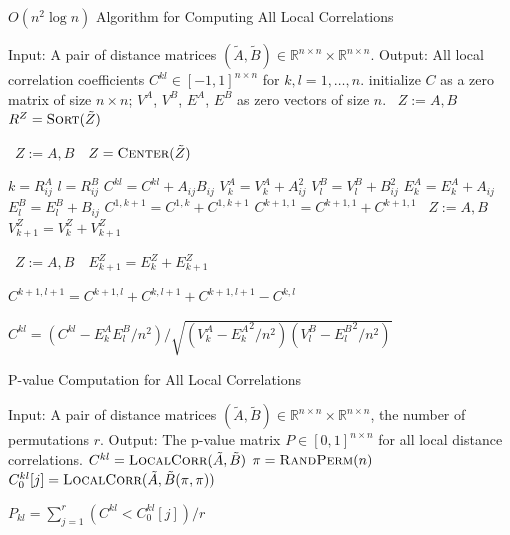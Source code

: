 \documentclass[11pt]{article}
\newcommand{\Real}{\mathbb{R}}
\newcommand{\G}{C}
\newcommand{\Linefor}[2]{%
    \State \algorithmicfor\ {#1}\ \algorithmicdo\ {#2} \algorithmicend\ \algorithmicfor%
}
\begin{document}
\begin{algorithm}
\caption{$O(n^2 \log n)$ Algorithm for Computing All Local Correlations}
\label{alg:all_scales}
\begin{algorithmic}[1]
\Statex Input: A pair of distance matrices $(\tilde{A},\tilde{B}) \in \Real^{n \times n} \times \Real^{n \times n}$.
\Statex Output: All local correlation coefficients $\G^{kl} \in [-1,1]^{n \times n}$ for $k,l=1,\ldots,n$.
\State initialize $\G$ as a zero matrix of size $n \times n$; $V^{A}$, $V^{B}$, $E^{A}$, $E^{B}$ as zero vectors of size $n$.
\Linefor{$Z:=A,B$}{$R^{Z}=\textsc{Sort}(\tilde{Z})$}
\Linefor{$Z:=A,B$}{$Z=\textsc{Center}(\tilde{Z})$}
\State $k=R^{A}_{ij}$
\State $l=R^{B}_{ij}$
\State $\G^{kl}=\G^{kl}+A_{ij}B_{ij}$
\State $V^{A}_{k}=V^{A}_{k}+A_{ij}^2$
\State $V^{B}_{l}=V^{B}_{l}+B_{ij}^2$
\State $E^{A}_{k}=E^{A}_{k}+A_{ij}$
\State $E^{B}_{l}=E^{B}_{l}+B_{ij}$
\EndFor
\Statex {}
\State $\G^{1, k+1}=\G^{1, k}+\G^{1, k+1}$
\State $\G^{k+1,1}=\G^{k+1,1}+\G^{k+1,1}$
\Linefor{$Z:=A,B$}{$V^{Z}_{k+1}=V^{Z}_{k}+V^{Z}_{k+1}$}
\Linefor{$Z:=A,B$}{$E^{Z}_{k+1}=E^{Z}_{k}+E^{Z}_{k+1}$}
\EndFor

\State $\G^{k+1,l+1}=\G^{k+1,l}+\G^{k,l+1}+\G^{k+1,l+1}-\G^{k,l}$
\EndFor

 
\State $\G^{kl}=\left(\G^{kl}-E^{A}_{k}E^{B}_{l}/n^2\right)/\sqrt{\left(V^{A}_{k}-{E^{A}_{k}}^2/n^2\right) \left(V^{B}_{l}-{E^{B}_{l}}^2/n^2\right)}$
\EndFor
\EndFunction
\end{algorithmic}
\end{algorithm}

\begin{algorithm}
\caption{P-value Computation for All Local Correlations}
\label{alg:pval}
\begin{algorithmic}[1]
\Statex Input: A pair of distance matrices $(\tilde{A},\tilde{B}) \in \Real^{n \times n} \times \Real^{n \times n}$, the number of permutations $r$.
\Statex Output: The p-value matrix $P \in [0,1]^{n \times n}$ for all local distance correlations.
\State $\G^{kl}=\textsc{LocalCorr}(\tilde{A},\tilde{B})$ 
\State $\pi=\textsc{RandPerm}(n)$ 
\State $\G^{kl}_{0}[j]=\textsc{LocalCorr}(\tilde{A},\tilde{B}(\pi,\pi))$ 
\EndFor

\State $P_{kl}=\sum_{j=1}^{r}(\G^{kl}<\G^{kl}_{0}[j])/r$ 
\EndFor
\EndFunction
\end{algorithmic}
\end{algorithm}
\end{document}

